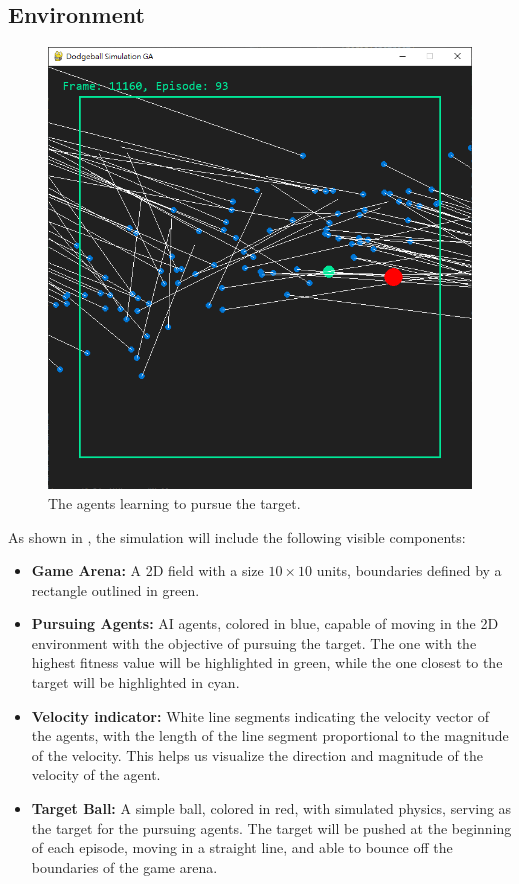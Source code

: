 \documentclass[sigconf]{acmart}
\begin{document}
\subsection{Environment}
\begin{figure}[H]
  \centering
  \includegraphics[width=0.8\linewidth]{imgs/demo01.png}
  \caption{The agents learning to pursue the target.}
  \label{fig:ball_demo}
\end{figure}
As shown in , the simulation will include the following visible components:
\begin{itemize}
  \item \textbf{Game Arena:} A 2D field with a size $10\times10$ units, boundaries defined by a rectangle outlined in green.
  \item \textbf{Pursuing Agents:} AI agents, colored in blue, capable of moving in the 2D environment with the objective of pursuing the target. The one with the highest fitness value will be highlighted in green, while the one closest to the target will be highlighted in cyan.
  \item \textbf{Velocity indicator:} White line segments indicating the velocity vector of the agents, with the length of the line segment proportional to the magnitude of the velocity. This helps us visualize the direction and magnitude of the velocity of the agent.
  \item \textbf{Target Ball:} A simple ball, colored in red, with simulated physics, serving as the target for the pursuing agents. The target will be pushed at the beginning of each episode, moving in a straight line, and able to bounce off the boundaries of the game arena.
\end{itemize}
\end{document}
